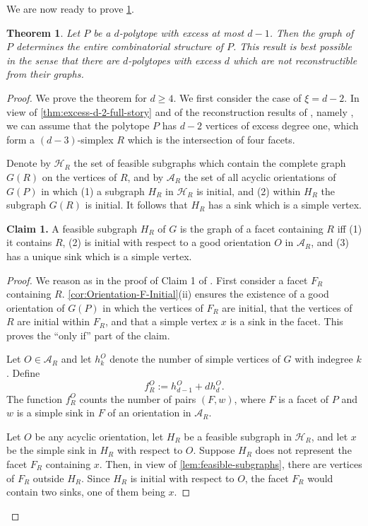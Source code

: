 \documentclass[a4paper]{amsart}
\newtheorem{theorem}{Theorem}
\theoremstyle{definition}
\theoremstyle{remark}
\begin{document}
We are now ready to prove \cref{thm:ExcessRec}.

\begin{theorem}\label{thm:ExcessRec} Let $P$ be a $d$-polytope with excess at most $d-1$. Then the graph of $P$ determines the entire combinatorial structure of $P$. This result is best possible in the sense that there are $d$-polytopes with excess $d$ which are not reconstructible from their graphs.
\end{theorem}

\begin{proof} We prove the theorem for $d\ge 4$. We first consider the case of $\xi=d-2$. In view of \cref{thm:excess-d-2-full-story} and of the reconstruction results of \cite{NevPinUgo17}, namely \cite[Thms.~4.5-4.6]{NevPinUgo17}, we can assume that 
the polytope $P$ has $d-2$ vertices of excess degree one, which form a $(d-3)$-simplex $R$ which is the intersection of four facets.

Denote by $\mathcal{H}_R$ the set of feasible subgraphs which contain the complete graph $G(R)$ on the vertices of $R$, and by  $\mathcal{A}_R$  the set of all acyclic orientations of $G(P)$ in which (1)  a subgraph $H_R$ in $\mathcal{H}_R$ is initial, and (2) within $H_R$ the subgraph $G(R)$ is initial. It follows that $H_R$ has a sink which is a simple vertex.

{\bf Claim 1.} A feasible subgraph $H_R$  of $G$  is the graph of a facet containing $R$ iff (1) it contains $R$,  (2) is initial with respect to a good orientation $O$ in $\mathcal{A}_R$, and (3) has a unique sink which is a simple vertex. 
\begin{proof}

We reason as in the proof of Claim 1 of \cite[Thm.~4.6]{NevPinUgo17}.
First consider a facet $F_R$ containing $R$. \cref{cor:Orientation-F-Initial}(ii) ensures the existence of a good orientation of $G(P)$ in which the vertices of $F_R$ are initial, that the vertices of $R$ are initial within $F_R$, and that a simple vertex $x$ is a sink in the facet.  This proves the ``only if'' part of the claim. 

 Let $O\in \mathcal{A}_R$ and let $h_k^O$ denote the number of simple vertices of $G$ with indegree $k$. Define\[f^O_{R}:=h^O_{d-1}+dh_d^O.\] 
The function $f^O_{R}$ counts the number of pairs $(F,w)$, where $F$ is a facet of $P$ and $w$ is a simple sink in $F$ of an orientation in $\mathcal{A}_R$. 

Let $O$ be any acyclic orientation, let $H_R$ be a feasible subgraph in $\mathcal{H}_R$, and let $x$ be the simple sink in $H_R$ with respect to $O$. Suppose $H_R$ does not represent the facet $F_R$ containing $x$. Then, in view of \cref{lem:feasible-subgraphs}, there are vertices of  $F_R$ outside $H_R$. Since $H_R$ is initial with respect to $O$, the facet $F_R$ would contain two sinks, one of them being $x$. 


\end{proof}
\end{proof}
\end{document}
